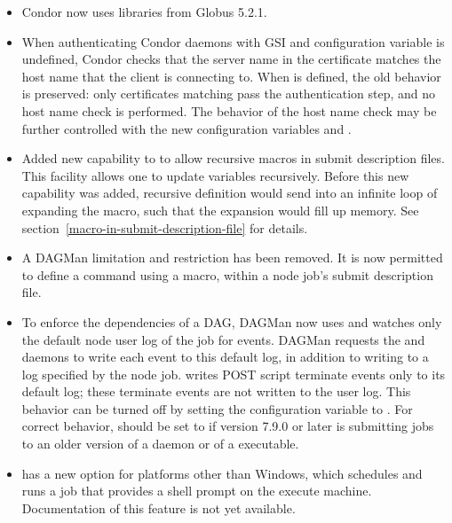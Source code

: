 \begin{itemize}
\item Condor now uses libraries from Globus 5.2.1.

\item When authenticating Condor daemons with GSI and
configuration variable  is undefined, 
Condor checks that the server name in the certificate matches the 
host name that the client is connecting to. 
When  is defined,
the old behavior is preserved: only certificates matching
 pass the authentication step, 
and no host name check is performed.  
The behavior of the host name check
may be further controlled with the new configuration variables
 and
.

\item Added new capability to  to allow recursive macros in
submit description files. 
This facility allows one to update variables recursively. 
Before this new capability was added,
recursive definition would send  into an
infinite loop of expanding the macro,
such that the expansion would fill up memory.
See section~\ref{macro-in-submit-description-file} for details.

\item A DAGMan limitation and restriction has been removed.  
It is now permitted to define a  command using a macro,
within a node job's submit description file.

\item To enforce the dependencies of a DAG,
DAGMan now uses and watches only the default node
user log of the  job for events.  
DAGMan requests the  and  daemons to write each
event to this default log, 
in addition to writing to a log specified by the node job.
 writes POST script terminate events only to its default log;
these terminate events are not written to the user log.
This behavior can be turned off by setting the configuration variable
 to .
For correct behavior,
 should be set to 
if  version 7.9.0 or later is submitting jobs 
to an older version of
a  daemon or of a  executable.

\item {} has a new  option for
platforms other than Windows,
which schedules and runs a job that provides a shell prompt
on the execute machine.
Documentation of this feature is not yet available.

\end{itemize}

